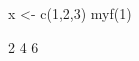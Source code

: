 \begin{Schunk}
\begin{Sinput}
 x <- c(1,2,3)
 myf(1)
\end{Sinput}
\begin{Soutput}
[1] 2 4 6
\end{Soutput}
\end{Schunk}
